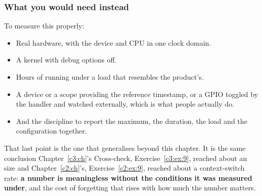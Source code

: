 \subsubsection{What you would need instead}
\label{c12:app:b:what-you-would-need-instead}

To measure this properly:
\begin{itemize}
  \item Real hardware, with the device and CPU in one clock domain.
  \item A kernel with debug options off.
  \item Hours of running under a load that resembles the product's.
  \item A device or a scope providing the reference timestamp, or a GPIO toggled by the handler and
    watched externally, which is what people actually do.
  \item And the discipline to report the maximum, the duration, the load and the configuration
    together.
\end{itemize}
That last point is the one that generalises beyond this chapter. It is the same conclusion
Chapter~\ref{c3:ch}'s Cross-check, Exercise~\ref{c3:ex:9}, reached about an  size and
Chapter~\ref{c2:ch}'s, Exercise~\ref{c2:ex:9}, reached about a context-switch rate: \textbf{a number is meaningless without
the conditions it was measured under}, and the cost of forgetting that rises with how much the
number matters.
